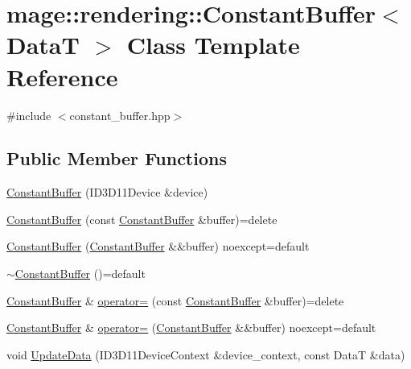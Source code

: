 \hypertarget{classmage_1_1rendering_1_1_constant_buffer}{}\section{mage\+:\+:rendering\+:\+:Constant\+Buffer$<$ DataT $>$ Class Template Reference}
\label{classmage_1_1rendering_1_1_constant_buffer}


{\ttfamily \#include $<$constant\+\_\+buffer.\+hpp$>$}

\subsection*{Public Member Functions}
\begin{DoxyCompactItemize}
\item 
\mbox{\hyperlink{classmage_1_1rendering_1_1_constant_buffer_a588d67fc6c3cf6317416b422d0442a5c}{Constant\+Buffer}} (I\+D3\+D11\+Device \&device)
\item 
\mbox{\hyperlink{classmage_1_1rendering_1_1_constant_buffer_a85af57c527713b8d877524d9f6ce4587}{Constant\+Buffer}} (const \mbox{\hyperlink{classmage_1_1rendering_1_1_constant_buffer}{Constant\+Buffer}} \&buffer)=delete
\item 
\mbox{\hyperlink{classmage_1_1rendering_1_1_constant_buffer_a615874bb60bdde1075ae912d7e5b7a37}{Constant\+Buffer}} (\mbox{\hyperlink{classmage_1_1rendering_1_1_constant_buffer}{Constant\+Buffer}} \&\&buffer) noexcept=default
\item 
\mbox{\hyperlink{classmage_1_1rendering_1_1_constant_buffer_a9c8ea67e36a9e80cfaabebdc0de2fae7}{$\sim$\+Constant\+Buffer}} ()=default
\item 
\mbox{\hyperlink{classmage_1_1rendering_1_1_constant_buffer}{Constant\+Buffer}} \& \mbox{\hyperlink{classmage_1_1rendering_1_1_constant_buffer_a8f07be2e30097690c88d4eb3338dbd5f}{operator=}} (const \mbox{\hyperlink{classmage_1_1rendering_1_1_constant_buffer}{Constant\+Buffer}} \&buffer)=delete
\item 
\mbox{\hyperlink{classmage_1_1rendering_1_1_constant_buffer}{Constant\+Buffer}} \& \mbox{\hyperlink{classmage_1_1rendering_1_1_constant_buffer_a25b1945f44cfbb7fd96bc146ca76adc7}{operator=}} (\mbox{\hyperlink{classmage_1_1rendering_1_1_constant_buffer}{Constant\+Buffer}} \&\&buffer) noexcept=default
\item 
void \mbox{\hyperlink{classmage_1_1rendering_1_1_constant_buffer_ac2b445fa570a1aadae959a60c840da73}{Update\+Data}} (I\+D3\+D11\+Device\+Context \&device\+\_\+context, const DataT \&data)

\end{DoxyCompactItemize}
